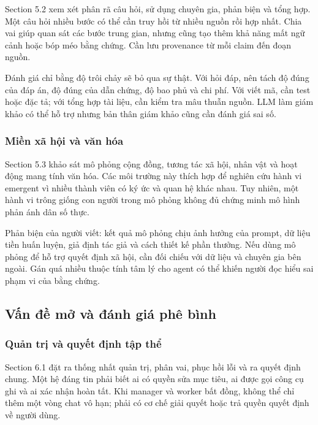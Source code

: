 Section 5.2 xem xét phân rã câu hỏi, sử dụng chuyên gia, phản biện và
tổng hợp. Một câu hỏi nhiều bước có thể cần truy hồi từ nhiều nguồn rồi
hợp nhất. Chia vai giúp quan sát các bước trung gian, nhưng cũng tạo
thêm khả năng mất ngữ cảnh hoặc bóp méo bằng chứng. Cần lưu provenance
từ mỗi claim đến đoạn nguồn.

Đánh giá chỉ bằng độ trôi chảy sẽ bỏ qua sự thật. Với hỏi đáp, nên tách
độ đúng của đáp án, độ đúng của dẫn chứng, độ bao phủ và chi phí. Với
viết mã, cần test hoặc đặc tả; với tổng hợp tài liệu, cần kiểm tra mâu
thuẫn nguồn. LLM làm giám khảo có thể hỗ trợ nhưng bản thân giám khảo
cũng cần đánh giá sai số.

\subsubsection{Miền xã hội và văn
hóa}\label{miux1ec1n-xuxe3-hux1ed9i-vuxe0-vux103n-huxf3a}

Section 5.3 khảo sát mô phỏng cộng đồng, tương tác xã hội, nhân vật và
hoạt động mang tính văn hóa. Các môi trường này thích hợp để nghiên cứu
hành vi emergent vì nhiều thành viên có ký ức và quan hệ khác nhau. Tuy
nhiên, một hành vi trông giống con người trong mô phỏng không đủ chứng
minh mô hình phản ánh dân số thực.

Phản biện của người viết: kết quả mô phỏng chịu ảnh hưởng của prompt, dữ
liệu tiền huấn luyện, giả định tác giả và cách thiết kế phần thưởng. Nếu
dùng mô phỏng để hỗ trợ quyết định xã hội, cần đối chiếu với dữ liệu và
chuyên gia bên ngoài. Gán quá nhiều thuộc tính tâm lý cho agent có thể
khiến người đọc hiểu sai phạm vi của bằng chứng.

\subsection{Vấn đề mở và đánh giá phê
bình}\label{vux1ea5n-ux111ux1ec1-mux1edf-vuxe0-ux111uxe1nh-giuxe1-phuxea-buxecnh}

\subsubsection{Quản trị và quyết định tập
thể}\label{quux1ea3n-trux1ecb-vuxe0-quyux1ebft-ux111ux1ecbnh-tux1eadp-thux1ec3}

Section 6.1 đặt ra thống nhất quản trị, phân vai, phục hồi lỗi và ra
quyết định chung. Một hệ đáng tin phải biết ai có quyền sửa mục tiêu, ai
được gọi công cụ ghi và ai xác nhận hoàn tất. Khi manager và worker bất
đồng, không thể chỉ thêm một vòng chat vô hạn; phải có cơ chế giải quyết
hoặc trả quyền quyết định về người dùng.

